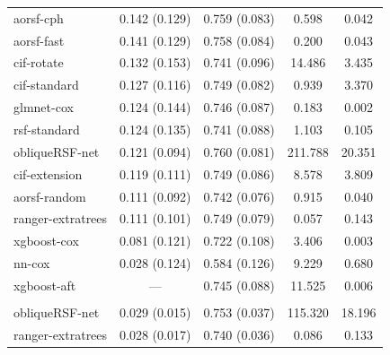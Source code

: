 \documentclass[12pt]{article}\usepackage[]{graphicx}\usepackage[]{xcolor}
\newenvironment{knitrout}{}{} %
\begin{document}
\begin{knitrout}
\begin{longtable}[t]{lcccc}
\endfoot
\bottomrule
\endlastfoot
\addlinespace[0.3em]
\multicolumn{5}{l}{\textit{\textbf{Overall}}}\\
\hline
\hspace{1em}aorsf-cph & 0.142 (0.129) & 0.759 (0.083) & 0.598 & 0.042\\
\hspace{1em}aorsf-fast & 0.141 (0.129) & 0.758 (0.084) & 0.200 & 0.043\\
\hspace{1em}cif-rotate & 0.132 (0.153) & 0.741 (0.096) & 14.486 & 3.435\\
\hspace{1em}cif-standard & 0.127 (0.116) & 0.749 (0.082) & 0.939 & 3.370\\
\hspace{1em}glmnet-cox & 0.124 (0.144) & 0.746 (0.087) & 0.183 & 0.002\\
\hspace{1em}rsf-standard & 0.124 (0.135) & 0.741 (0.088) & 1.103 & 0.105\\
\hspace{1em}obliqueRSF-net & 0.121 (0.094) & 0.760 (0.081) & 211.788 & 20.351\\
\hspace{1em}cif-extension & 0.119 (0.111) & 0.749 (0.086) & 8.578 & 3.809\\
\hspace{1em}aorsf-random & 0.111 (0.092) & 0.742 (0.076) & 0.915 & 0.040\\
\hspace{1em}ranger-extratrees & 0.111 (0.101) & 0.749 (0.079) & 0.057 & 0.143\\
\hspace{1em}xgboost-cox & 0.081 (0.121) & 0.722 (0.108) & 3.406 & 0.003\\
\hspace{1em}nn-cox & 0.028 (0.124) & 0.584 (0.126) & 9.229 & 0.680\\
\hspace{1em}xgboost-aft & --- & 0.745 (0.088) & 11.525 & 0.006\\
\addlinespace[0.3em]
\multicolumn{5}{l}{\textit{\textbf{ACTG 320; AIDS diagnosis, n = 1151, p = 12}}}\\
\hline
\hspace{1em}obliqueRSF-net & 0.029 (0.015) & 0.753 (0.037) & 115.320 & 18.196\\
\hspace{1em}ranger-extratrees & 0.028 (0.017) & 0.740 (0.036) & 0.086 & 0.133\\

\end{longtable}
\end{knitrout}
\end{document}
